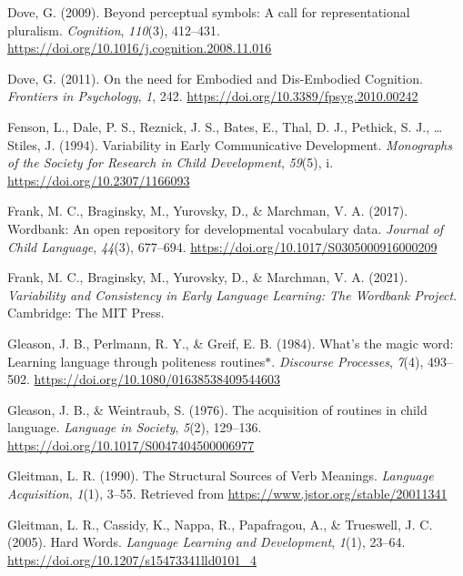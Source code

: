\documentclass[
  man,floatsintext]{apa6}
\newlength{\cslhangindent}
\newenvironment{CSLReferences}[2] %
 {\begin{list}{}{%
  \setlength{\itemindent}{0pt}
  \setlength{\leftmargin}{0pt}
  \setlength{\parsep}{0pt}
  \ifodd #1
   \setlength{\leftmargin}{\cslhangindent}
   \setlength{\itemindent}{-1\cslhangindent}
  \fi
  \setlength{\itemsep}{#2\baselineskip}}}
 {\end{list}}
\begin{document}
\begin{CSLReferences}{1}{0}
Dove, G. (2009). Beyond perceptual symbols: {A} call for representational pluralism. \emph{Cognition}, \emph{110}(3), 412--431. \url{https://doi.org/10.1016/j.cognition.2008.11.016}

Dove, G. (2011). On the need for {Embodied} and {Dis-Embodied Cognition}. \emph{Frontiers in Psychology}, \emph{1}, 242. \url{https://doi.org/10.3389/fpsyg.2010.00242}

Fenson, L., Dale, P. S., Reznick, J. S., Bates, E., Thal, D. J., Pethick, S. J., \ldots{} Stiles, J. (1994). Variability in {Early Communicative Development}. \emph{Monographs of the Society for Research in Child Development}, \emph{59}(5), i. \url{https://doi.org/10.2307/1166093}

Frank, M. C., Braginsky, M., Yurovsky, D., \& Marchman, V. A. (2017). Wordbank: An open repository for developmental vocabulary data. \emph{Journal of Child Language}, \emph{44}(3), 677--694. \url{https://doi.org/10.1017/S0305000916000209}

Frank, M. C., Braginsky, M., Yurovsky, D., \& Marchman, V. A. (2021). \emph{Variability and {Consistency} in {Early Language Learning}: {The Wordbank Project}}. Cambridge: The MIT Press.

Gleason, J. B., Perlmann, R. Y., \& Greif, E. B. (1984). What's the magic word: {Learning} language through politeness routines{\(\ast\)}. \emph{Discourse Processes}, \emph{7}(4), 493--502. \url{https://doi.org/10.1080/01638538409544603}

Gleason, J. B., \& Weintraub, S. (1976). The acquisition of routines in child language. \emph{Language in Society}, \emph{5}(2), 129--136. \url{https://doi.org/10.1017/S0047404500006977}

Gleitman, L. R. (1990). The {Structural Sources} of {Verb Meanings}. \emph{Language Acquisition}, \emph{1}(1), 3--55. Retrieved from \url{https://www.jstor.org/stable/20011341}

Gleitman, L. R., Cassidy, K., Nappa, R., Papafragou, A., \& Trueswell, J. C. (2005). Hard {Words}. \emph{Language Learning and Development}, \emph{1}(1), 23--64. \url{https://doi.org/10.1207/s15473341lld0101_4}


\end{CSLReferences}
\end{document}
